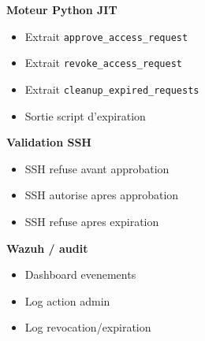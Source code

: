 \textbf{Moteur Python JIT}
\begin{itemize}
	\item [ ] Extrait \texttt{approve\_access\_request}
	\item [ ] Extrait \texttt{revoke\_access\_request}
	\item [ ] Extrait \texttt{cleanup\_expired\_requests}
	\item [ ] Sortie script d'expiration
\end{itemize}

\textbf{Validation SSH}
\begin{itemize}
	\item [ ] SSH refuse avant approbation
	\item [ ] SSH autorise apres approbation
	\item [ ] SSH refuse apres expiration
\end{itemize}

\textbf{Wazuh / audit}
\begin{itemize}
	\item [ ] Dashboard evenements
	\item [ ] Log action admin
	\item [ ] Log revocation/expiration
\end{itemize}
